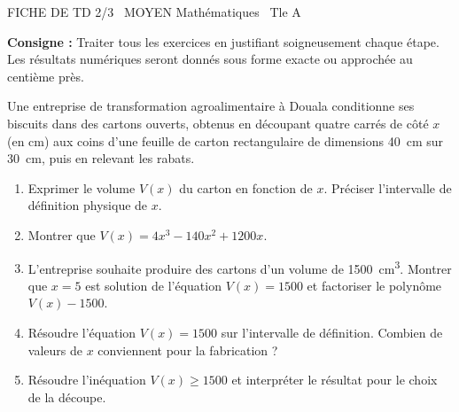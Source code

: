 \documentclass[11pt]{article}
\begin{document}
\begin{tcolorbox}[enhanced,colback=popink,colframe=popink,arc=10pt,boxrule=0pt,left=12pt,right=12pt,top=9pt,bottom=9pt]
{\color{white}\popxbold\small FICHE DE TD 2/3 \textbullet\ MOYEN \hfill Mathématiques \textbullet\ Tle A\par}
\end{tcolorbox}
\vspace{4pt}
\noindent\textbf{Consigne :} Traiter tous les exercices en justifiant soigneusement chaque étape. Les résultats numériques seront donnés sous forme exacte ou approchée au centième près.

\begin{exercice}
Une entreprise de transformation agroalimentaire à Douala conditionne ses biscuits dans des cartons ouverts, obtenus en découpant quatre carrés de côté $x$ (en cm) aux coins d'une feuille de carton rectangulaire de dimensions \SI{40}{\centi\meter} sur \SI{30}{\centi\meter}, puis en relevant les rabats.
\begin{enumerate}
    \item Exprimer le volume $V(x)$ du carton en fonction de $x$. Préciser l'intervalle de définition physique de $x$.
    \item Montrer que $V(x) = 4x^3 - 140x^2 + 1200x$.
    \item L'entreprise souhaite produire des cartons d'un volume de \SI{1500}{\centi\meter\cubed}. Montrer que $x = 5$ est solution de l'équation $V(x) = 1500$ et factoriser le polynôme $V(x) - 1500$.
    \item Résoudre l'équation $V(x) = 1500$ sur l'intervalle de définition. Combien de valeurs de $x$ conviennent pour la fabrication ?
    \item Résoudre l'inéquation $V(x) \ge 1500$ et interpréter le résultat pour le choix de la découpe.
\end{enumerate}
\end{exercice}
\end{document}
